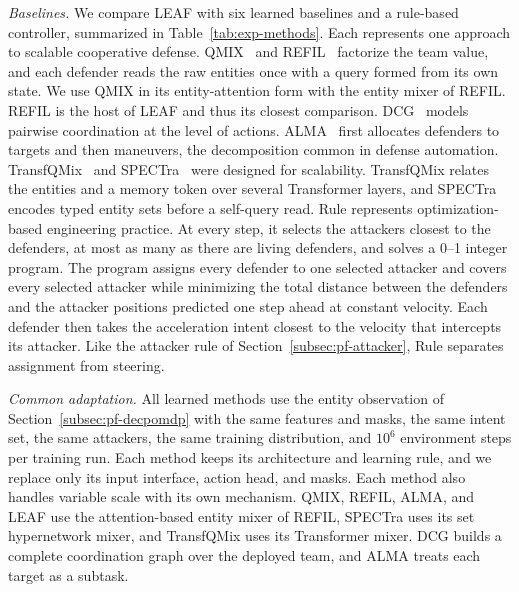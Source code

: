 \emph{Baselines.} We compare LEAF with six learned baselines and a rule-based controller, summarized in Table~\ref{tab:exp-methods}. Each represents one approach to scalable cooperative defense. QMIX~\cite{rashid2018qmix} and REFIL~\cite{iqbal2021refil} factorize the team value, and each defender reads the raw entities once with a query formed from its own state. We use QMIX in its entity-attention form with the entity mixer of REFIL. REFIL is the host of LEAF and thus its closest comparison. DCG~\cite{boehmer2020dcg} models pairwise coordination at the level of actions. ALMA~\cite{iqbal2022alma} first allocates defenders to targets and then maneuvers, the decomposition common in defense automation. TransfQMix~\cite{transfqmix2023} and SPECTra~\cite{park2026spectra} were designed for scalability. TransfQMix relates the entities and a memory token over several Transformer layers, and SPECTra encodes typed entity sets before a self-query read. Rule represents optimization-based engineering practice. At every step, it selects the attackers closest to the defenders, at most as many as there are living defenders, and solves a 0--1 integer program. The program assigns every defender to one selected attacker and covers every selected attacker while minimizing the total distance between the defenders and the attacker positions predicted one step ahead at constant velocity. Each defender then takes the acceleration intent closest to the velocity that intercepts its attacker. Like the attacker rule of Section~\ref{subsec:pf-attacker}, Rule separates assignment from steering.

\emph{Common adaptation.} All learned methods use the entity observation of Section~\ref{subsec:pf-decpomdp} with the same features and masks, the same intent set, the same attackers, the same training distribution, and $10^6$ environment steps per training run. Each method keeps its architecture and learning rule, and we replace only its input interface, action head, and masks. Each method also handles variable scale with its own mechanism. QMIX, REFIL, ALMA, and LEAF use the attention-based entity mixer of REFIL, SPECTra uses its set hypernetwork mixer, and TransfQMix uses its Transformer mixer. DCG builds a complete coordination graph over the deployed team, and ALMA treats each target as a subtask.

